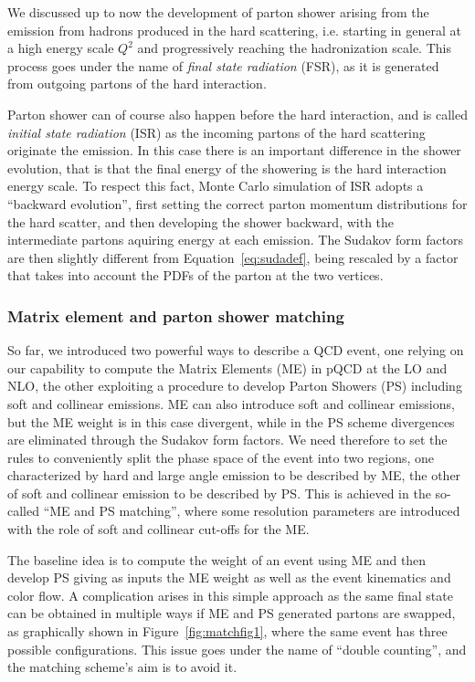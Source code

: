 We discussed up to now the development of parton shower arising
from the emission from hadrons produced in the hard scattering, i.e. 
starting in general at a high energy scale $Q^2$ and progressively
reaching the hadronization scale. This process goes under the name of
{\it final state radiation} (FSR), as it is generated from outgoing
partons of the hard interaction.

Parton shower can of course also happen before the hard interaction, and
is called {\it initial state radiation} (ISR) as the incoming partons
of the hard scattering originate the emission. In this case
there is an important difference in the shower evolution, that is
that the final energy of the showering is the hard interaction energy
scale. To respect this fact, Monte Carlo simulation of ISR adopts a 
``backward evolution'', first setting the correct parton momentum distributions
for the hard scatter, and then developing the shower backward, with the 
intermediate partons aquiring energy at each emission. The Sudakov form 
factors are then slightly different from Equation~\ref{eq:sudadef}, being
rescaled by a factor that takes into account the PDFs of the parton at the
two vertices.


\subsubsection{Matrix element and parton shower matching}\label{sec:matching}

So far, we introduced two powerful ways to describe a QCD event, one relying
on our capability to compute the Matrix Elements (ME) in pQCD at the LO and NLO,
the other exploiting a procedure to develop Parton Showers (PS) including
soft and collinear emissions. ME can also introduce soft and collinear emissions,
but the ME weight is in this case divergent, while in the PS scheme divergences
are eliminated through the Sudakov form factors. We need therefore to set 
the rules to conveniently split the phase space of the event into two regions,
one characterized by hard and large angle emission to be described by ME, the
other of soft and collinear emission to be described by PS. This is achieved
in the so-called ``ME and PS matching'', where some resolution parameters are
introduced with the role of soft and collinear cut-offs for the ME. 

The baseline idea is to compute the weight of an event using ME and then
develop PS giving as inputs the ME weight as well as the event kinematics and 
color flow. A complication arises in this simple approach as the same final
state can be obtained in multiple ways if ME and PS generated partons are swapped,
as graphically shown in Figure~\ref{fig:matchfig1}, where the same event 
has three possible configurations. This issue goes under the name of ``double
counting'', and the matching scheme's aim is to avoid it.

